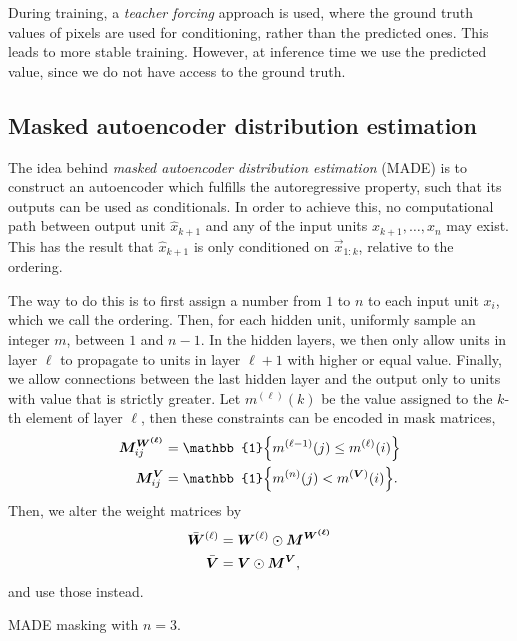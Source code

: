 During training, a \textit{teacher forcing} approach is used, where the ground truth values of
pixels are used for conditioning, rather than the predicted ones. This leads to more stable
training. However, at inference time we use the predicted value, since we do not have access to the
ground truth.

\subsection{Masked autoencoder distribution estimation}

The idea behind \textit{masked autoencoder distribution estimation} (MADE) \citep{germain2015made}
is to construct an autoencoder which fulfills the autoregressive property, such that its outputs
can be used as conditionals. In order to achieve this, no computational path between output unit
$\hat{x}_{k+1}$ and any of the input units $x_{k+1}, \ldots, x_n$ may exist. This has the result
that $\hat{x}_{k+1}$ is only conditioned on $\vec{x}_{1:k}$, relative to the ordering.

The way to do this is to first assign a number from $1$ to $n$ to each input unit $x_i$, which we
call the ordering. Then, for each hidden unit, uniformly sample an integer $m$, between $1$ and
$n-1$. In the hidden layers, we then only allow units in layer $\ell$ to propagate to units in
layer $\ell+1$ with higher or equal value. Finally, we allow connections between the last hidden
layer and the output only to units with value that is strictly greater. Let $m^{(\ell)}(k)$ be the
value assigned to the $k$-th element of layer $\ell$, then these constraints can be encoded in mask
matrices,
\begin{align*}
    \mat{M}^{\mat{W^{(\ell)}}}_{ij} & = \mathbb{1}\lft\{ m^{(\ell-1)}(j) \leq m^{(\ell)}(i) \rgt\} \\
    \mat{M}^{\mat{V}}_{ij}          & = \mathbb{1}\lft\{ m^{(n)}(j) < m^{(\mat{V})}(i) \rgt\}.
\end{align*}
Then, we alter the weight matrices by
\begin{align*}
    \bar{\bm{W}}^{(\ell)} & = \bm{W}^{(\ell)} \odot \bm{M}^{\bm{W^{(\ell)}}} \\
    \bar{\bm{V}}          & = \bm{V} \odot \bm{M}^{\bm{V}},
\end{align*}
and use those instead.

\begin{marginfigure}[-7cm]
    \centering
    \caption{MADE masking with $n=3$.}
    \label{fig:made-masking}
\end{marginfigure}

